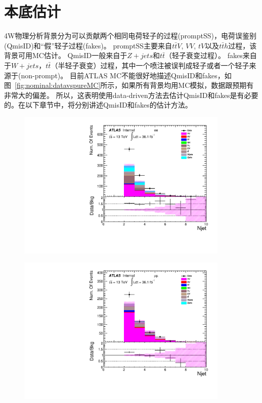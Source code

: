 \section{本底估计}\label{sec:bkg_estimation}
4W物理分析背景分为可以贡献两个相同电荷轻子的过程(promptSS)，电荷误鉴别(QmisID)和“假”轻子过程(fakes)。
promptSS主要来自$t\bar{t}V$, $VV$, $tV$以及$t\bar{t}h$过程，该背景可用MC估计。
QmisID一般来自于$Z+jets$和$t\bar{t}$（轻子衰变过程）。
fakes来自于$W+jets$，$t\bar{t}$（半轻子衰变）过程，其中一个喷注被误判成轻子或者一个轻子来源于\bjet (non-prompt)。
目前ATLAS MC不能很好地描述QmisID和fakes，如图~\ref{fig:nominal:datavspureMC}所示，如果所有背景均用MC模拟，数据跟预期有非常大的偏差。
所以，这表明使用data-driven方法去估计QmisID和fakes是有必要的。在以下章节中，将分别讲述QmisID和fakes的估计方法。
\begin{figure}[h]
\begin{minipage}[t]{0.33\linewidth}
 \centering
 \includegraphics[width=0.9\textwidth,angle=-90]{fig/nominal/numOfjet_ee.pdf}
 \label{fig:nominal:numOfjet_ee.pdf}
 \end{minipage}
\begin{minipage}[t]{0.33\linewidth}
 \centering
 \includegraphics[width=0.9\textwidth,angle=-90]{fig/nominal/numOfjet_mumu.pdf}

\end{minipage}
\end{figure}
